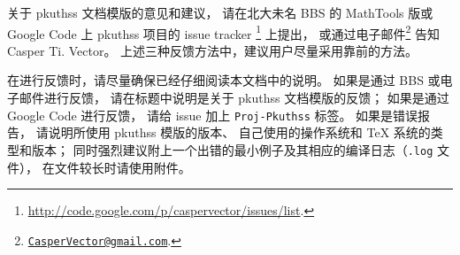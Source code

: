 	关于 pkuthss 文档模版的意见和建议，
	请在北大未名 BBS 的 MathTools 版或 %
	Google Code 上 pkuthss 项目的 issue tracker%
	\footnote{\url{http://code.google.com/p/caspervector/issues/list}.}%
	上提出，
	或通过电子邮件\footnote%
	{\href{mailto:CasperVector@gmail.com}{\texttt{CasperVector@gmail.com}}.}%
	告知 Casper Ti. Vector。
	上述三种反馈方法中，建议用户尽量采用靠前的方法。

	在进行反馈时，请尽量确保已经仔细阅读本文档中的说明。
	如果是通过 BBS 或电子邮件进行反馈，
	请在标题中说明是关于 pkuthss 文档模版的反馈；
	如果是通过 Google Code 进行反馈，
	请给 issue 加上 \verb|Proj-Pkuthss| 标签。
	如果是错误报告，
	请说明所使用 pkuthss 模版的版本、
	自己使用的操作系统和 \TeX{} 系统的类型和版本；
	同时强烈建议附上一个出错的最小例子及其相应的编译日志（\verb|.log| 文件），
	在文件较长时请使用附件。

